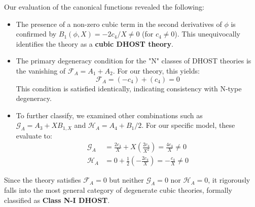\documentclass[twocolumn]{aastex631}
\begin{document}
Our evaluation of the canonical functions revealed the following:
\begin{itemize}
    \item The presence of a non-zero cubic term in the second derivatives of $\phi$ is confirmed by $B_1(\phi, X) = -2c_4/X \neq 0$ (for $c_4 \neq 0$). This unequivocally identifies the theory as a \textbf{cubic DHOST theory}.
    \item The primary degeneracy condition for the "N" classes of DHOST theories is the vanishing of $\mathcal{F}_A = A_1 + A_2$. For our theory, this yields:
    \begin{equation*}
    \mathcal{F}_A = (-c_4) + (c_4) = 0
    \end{equation*}
    This condition is satisfied identically, indicating consistency with N-type degeneracy.
    \item To further classify, we examined other combinations such as $\mathcal{G}_A = A_3 + X B_{1,X}$ and $\mathcal{H}_A = A_4 + B_1/2$. For our specific model, these evaluate to:
    \begin{align*}
    \mathcal{G}_A &= \frac{2c_4}{X} + X \left(\frac{2c_4}{X^2}\right) = \frac{4c_4}{X} \neq 0 \\
    \mathcal{H}_A &= 0 + \frac{1}{2}\left(-\frac{2c_4}{X}\right) = -\frac{c_4}{X} \neq 0
    \end{align*}
\end{itemize}
Since the theory satisfies $\mathcal{F}_A=0$ but neither $\mathcal{G}_A=0$ nor $\mathcal{H}_A=0$, it rigorously falls into the most general category of degenerate cubic theories, formally classified as \textbf{Class N-I DHOST}.
\end{document}
